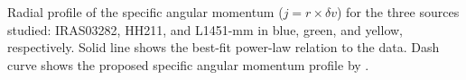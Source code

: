 \label{Fig:summary}
Radial profile of the specific angular momentum ($j=r \times \delta v$) for the three sources studied: 
IRAS03282, HH211, and L1451-mm in blue, green, and yellow, respectively. 
Solid line shows the best-fit power-law relation to the data.
Dash curve shows the proposed specific angular momentum profile by \cite{Belloche_2013}. 
